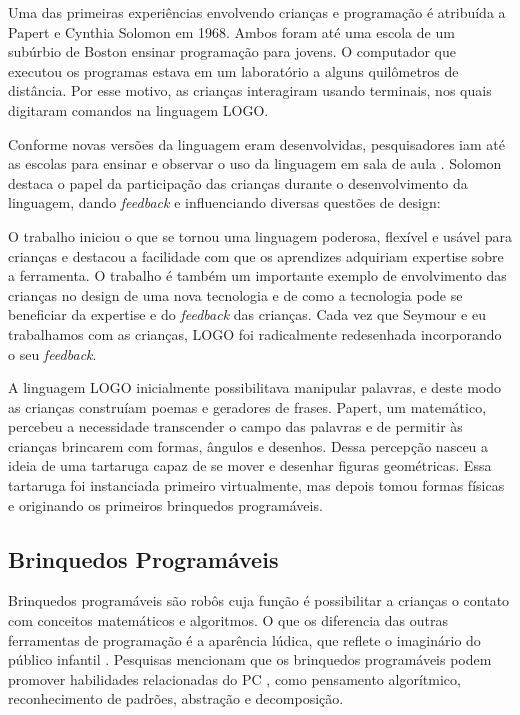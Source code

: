 Uma das primeiras experiências envolvendo crianças e programação é atribuída a Papert e Cynthia Solomon em 1968. Ambos foram até uma escola de um subúrbio de Boston ensinar programação para jovens. O computador que executou os programas estava em um laboratório a alguns quilômetros de distância. Por esse motivo, as crianças interagiram usando terminais, nos quais digitaram comandos na linguagem LOGO. 

Conforme novas versões da linguagem eram desenvolvidas, pesquisadores iam até as escolas para ensinar e observar o uso da linguagem em sala de aula \cite{bers_coding_2018}. Solomon destaca o papel da participação das crianças durante o desenvolvimento da linguagem, dando \textit{feedback} e influenciando diversas questões de design:

\begin{citacao}
O trabalho iniciou o que se tornou uma linguagem poderosa, flexível e usável para crianças e destacou a facilidade com que os aprendizes adquiriam expertise sobre a ferramenta. O trabalho é também um importante exemplo de envolvimento das crianças no design de uma nova tecnologia e de como a tecnologia pode se beneficiar da expertise e do \textit{feedback} das crianças. Cada vez que Seymour e eu trabalhamos com as crianças, LOGO foi radicalmente redesenhada incorporando o seu \textit{feedback}.
\end{citacao}

A linguagem LOGO inicialmente possibilitava manipular palavras, e deste modo as crianças construíam poemas e geradores de frases. Papert, um matemático, percebeu a necessidade transcender o campo das palavras e de permitir às crianças brincarem com formas, ângulos e desenhos. Dessa percepção nasceu a ideia de uma tartaruga capaz de se mover e desenhar figuras geométricas. Essa tartaruga foi instanciada primeiro virtualmente, mas depois tomou formas físicas e originando os primeiros brinquedos programáveis.

\subsection{Brinquedos Programáveis}
\label{brinquedos_programaveis}
Brinquedos programáveis são robôs cuja função é possibilitar a crianças o contato com conceitos matemáticos e algoritmos. O que os diferencia das outras ferramentas de programação é a aparência lúdica, que reflete o imaginário do público infantil \cite{raabe_2017_rope}. Pesquisas mencionam que os brinquedos programáveis podem promover habilidades relacionadas do \ac{PC} \cite{repiso_robotics_2019, bers_coding_2018, pugnali_impact_2017,  bers_computational_2014}, como pensamento algorítmico, reconhecimento de padrões, abstração e decomposição.

